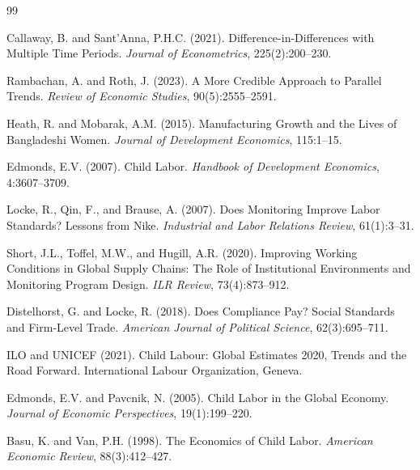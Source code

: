 \documentclass[12pt]{article}
\begin{document}
\begin{thebibliography}{99}

Callaway, B. and Sant'Anna, P.H.C. (2021).
\newblock Difference-in-Differences with Multiple Time Periods.
\newblock \textit{Journal of Econometrics}, 225(2):200--230.

Rambachan, A. and Roth, J. (2023).
\newblock A More Credible Approach to Parallel Trends.
\newblock \textit{Review of Economic Studies}, 90(5):2555--2591.

Heath, R. and Mobarak, A.M. (2015).
\newblock Manufacturing Growth and the Lives of Bangladeshi Women.
\newblock \textit{Journal of Development Economics}, 115:1--15.

Edmonds, E.V. (2007).
\newblock Child Labor.
\newblock \textit{Handbook of Development Economics}, 4:3607--3709.

Locke, R., Qin, F., and Brause, A. (2007).
\newblock Does Monitoring Improve Labor Standards? Lessons from Nike.
\newblock \textit{Industrial and Labor Relations Review}, 61(1):3--31.

Short, J.L., Toffel, M.W., and Hugill, A.R. (2020).
\newblock Improving Working Conditions in Global Supply Chains: The Role of Institutional Environments and Monitoring Program Design.
\newblock \textit{ILR Review}, 73(4):873--912.

Distelhorst, G. and Locke, R. (2018).
\newblock Does Compliance Pay? Social Standards and Firm-Level Trade.
\newblock \textit{American Journal of Political Science}, 62(3):695--711.

ILO and UNICEF (2021).
\newblock Child Labour: Global Estimates 2020, Trends and the Road Forward.
\newblock International Labour Organization, Geneva.

Edmonds, E.V. and Pavcnik, N. (2005).
\newblock Child Labor in the Global Economy.
\newblock \textit{Journal of Economic Perspectives}, 19(1):199--220.

Basu, K. and Van, P.H. (1998).
\newblock The Economics of Child Labor.
\newblock \textit{American Economic Review}, 88(3):412--427.


\end{thebibliography}
\end{document}
